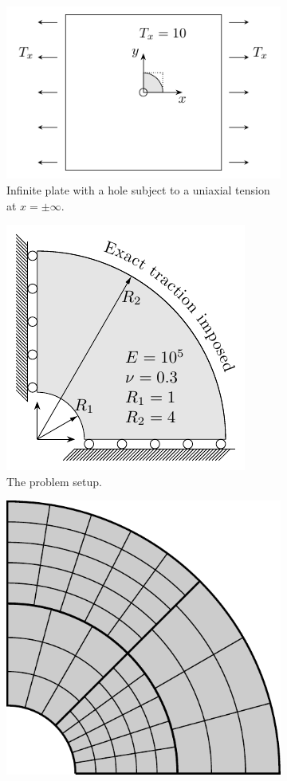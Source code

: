 \begin{figure}[ht]
	\captionsetup[subfigure]{width=0.9\textwidth}
	\center
	\begin{subfigure}[t]{.3\textwidth}
		\center
		\includegraphics[scale=.7]{Platewithhole}
		\caption{Infinite plate with a hole subject to a uniaxial tension at $x=\pm \infty$.}
	\end{subfigure}
	\begin{subfigure}[t]{.3\textwidth}
		\center
		\includegraphics[scale=.7]{annular}
		\caption{The problem setup.}
	\end{subfigure}
	\begin{subfigure}[t]{.3\textwidth}
		\center
		\includegraphics[scale=.45]{annular_mesh}

\end{subfigure}
\end{figure}

